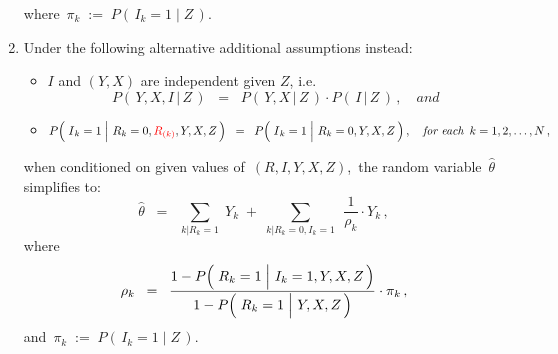 \begin{proposition}
\begin{enumerate}
	where \,$\pi_{k} \; := \; P(\,I_{k}=1\;\vert\;Z\,)$.
\item
	Under the following alternative additional assumptions instead:
	\begin{itemize}
	\item
		$I$ and $(Y,X)$ are independent given $Z$, i.e.
		\begin{equation*}
		P\!\left(\,Y,X,I\,\vert\,Z\,\right)
		\;\; = \;\;
			P\!\left(\,Y,X\,\vert\,Z\,\right)
			\cdot
			P\!\left(\,I\,\vert\,Z\,\right)\,,
			\quad
			\textit{and}
		\end{equation*}
	\item
		\begin{equation*}
		P\!\left(\,\left.\overset{{\color{white}.}}{I}_{k} = 1\;\right\vert\,R_{k}=0,{\color{red}R_{(k)}},Y,X,Z\,\right)
		\;\; = \;\;
			P\!\left(\,\left.\overset{{\color{white}.}}{I}_{k} = 1\;\right\vert\,R_{k}=0,Y,X,Z\,\right),
		\quad
		\textit{for each \,$k = 1,2,\ldots,N$}\,,
		\end{equation*}
	\end{itemize}
	when conditioned on given values of \,$(R,I,Y,X,Z)$,\, the random variable \,$\widehat{\theta}$\, simplifies to:
	\begin{equation*}
	\widehat{\theta}
	\;\; = \;\;
		\underset{k\vert R_{k}=1}{\sum}\; Y_{k}
		\; + \;
		\underset{k\vert R_{k}=0,I_{k}=1}{\sum}\;\, \dfrac{1}{\rho_{k}}\cdot Y_{k}\,,
	\end{equation*}
	where
	\begin{equation*}
	\rho_{k}
	\;\; = \;\;
		\dfrac{
			1 - P\!\left(\,\left.\overset{{\color{white}.}}{R}_{k}=1\;\right\vert\,I_{k}=1,Y,X,Z\,\right)
			}{
			1 - P\!\left(\,\left.\overset{{\color{white}.}}{R}_{k}=1\;\right\vert\,Y,X,Z\,\right)
			}
		\cdot
		\pi_{k}\,,
	\end{equation*}
	and \,$\pi_{k} \; := \; P(\,I_{k}=1\;\vert\;Z\,)$.
\end{enumerate}
\end{proposition}
\proof
